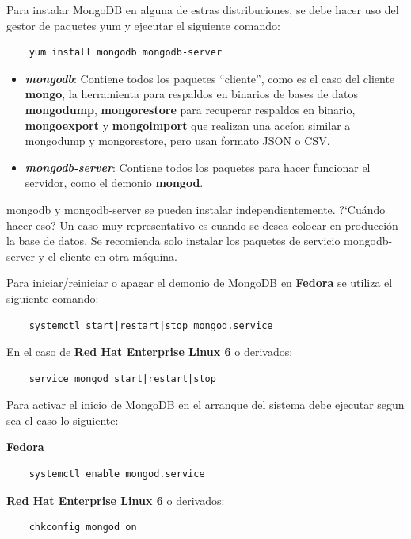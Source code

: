 Para instalar MongoDB en alguna de estras distribuciones, se debe hacer uso del gestor de paquetes yum y ejecutar el siguiente comando:

\begin{lstlisting}
    yum install mongodb mongodb-server
\end{lstlisting}

\begin{itemize}
    \item \textit{\textbf{mongodb}}: Contiene todos los paquetes ``cliente'', como es el caso del cliente \textbf{mongo}, la herramienta para respaldos en binarios de bases de datos \textbf{mongodump}, \textbf{mongorestore} para recuperar respaldos en binario, \textbf{mongoexport} y \textbf{mongoimport} que realizan una acc\'ion similar a mongodump y mongorestore, pero usan formato JSON o CSV.
    \item \textit{\textbf{mongodb-server}}: Contiene todos los paquetes para hacer funcionar el servidor, como el demonio \textbf{mongod}.
\end{itemize}

mongodb y mongodb-server se pueden instalar independientemente. ?`Cu\'ando hacer eso? Un caso muy representativo es cuando se desea colocar en producci\'on la base de datos. Se recomienda solo instalar los paquetes de servicio mongodb-server y el cliente en otra m\'aquina.

Para iniciar/reiniciar o apagar el demonio de MongoDB en \textbf{Fedora} se utiliza el siguiente comando:

\begin{lstlisting}
    systemctl start|restart|stop mongod.service
\end{lstlisting}

En el caso de \textbf{Red Hat Enterprise Linux 6} o derivados:

\begin{lstlisting}
    service mongod start|restart|stop
\end{lstlisting}

Para activar el inicio de MongoDB en el arranque del sistema debe ejecutar segun sea el caso lo siguiente:

\textbf{Fedora}

\begin{lstlisting}
    systemctl enable mongod.service
\end{lstlisting}

\textbf{Red Hat Enterprise Linux 6} o derivados:

\begin{lstlisting}
    chkconfig mongod on
\end{lstlisting}


